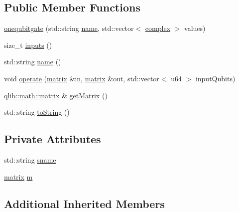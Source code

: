 \subsection*{Public Member Functions}
\begin{DoxyCompactItemize}
\item 
\hyperlink{classqlib_1_1quantum_1_1gates_1_1onequbitgate_a587ebdfa032f58bf63433c89c6015149}{onequbitgate} (std\+::string \hyperlink{classqlib_1_1quantum_1_1gates_1_1onequbitgate_aacf3878010f0c1327bae4dcc7faf4c92}{name}, std\+::vector$<$ \hyperlink{classqlib_1_1math_1_1complex}{complex} $>$ values)
\item 
size\+\_\+t \hyperlink{classqlib_1_1quantum_1_1gates_1_1onequbitgate_a050ed71ebff89050c3123124f8ba8719}{inputs} ()
\item 
std\+::string \hyperlink{classqlib_1_1quantum_1_1gates_1_1onequbitgate_aacf3878010f0c1327bae4dcc7faf4c92}{name} ()
\item 
void \hyperlink{classqlib_1_1quantum_1_1gates_1_1onequbitgate_a280c7a7d29032eeb95afcb3d6668e7db}{operate} (\hyperlink{classqlib_1_1math_1_1matrix}{matrix} \&in, \hyperlink{classqlib_1_1math_1_1matrix}{matrix} \&out, std\+::vector$<$ u64 $>$ input\+Qubits)
\item 
\hyperlink{classqlib_1_1math_1_1matrix}{qlib\+::math\+::matrix} \& \hyperlink{classqlib_1_1quantum_1_1gates_1_1onequbitgate_a39490c6d1dcc94dc82bb7345fe984278}{get\+Matrix} ()
\item 
std\+::string \hyperlink{classqlib_1_1quantum_1_1gates_1_1onequbitgate_a38af1af0f466add047c3e75780e28c80}{to\+String} ()
\end{DoxyCompactItemize}
\subsection*{Private Attributes}
\begin{DoxyCompactItemize}
\item 
std\+::string \hyperlink{classqlib_1_1quantum_1_1gates_1_1onequbitgate_abc5ac874b8a4174cc72a159d3c6d91d2}{sname}
\item 
\hyperlink{classqlib_1_1math_1_1matrix}{matrix} \hyperlink{classqlib_1_1quantum_1_1gates_1_1onequbitgate_a6d935a1219c646b16c136560a5b4f0bf}{m}
\end{DoxyCompactItemize}
\subsection*{Additional Inherited Members}


